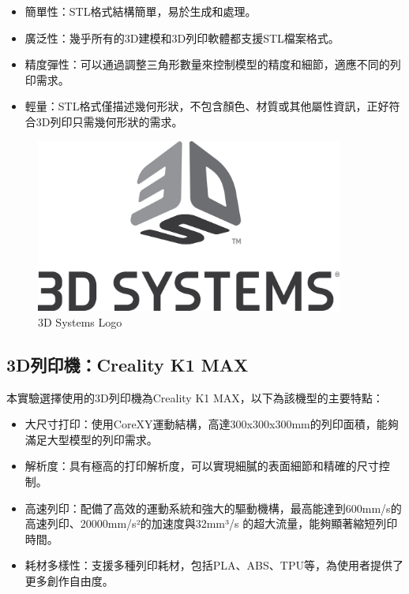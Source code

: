 \documentclass[class=NCU_thesis, crop=false]{standalone}
\begin{document}
\begin{itemize}
	\item 簡單性：STL格式結構簡單，易於生成和處理。
	\item 廣泛性：幾乎所有的3D建模和3D列印軟體都支援STL檔案格式。
	\item 精度彈性：可以通過調整三角形數量來控制模型的精度和細節，適應不同的列印需求。
	\item 輕量：STL格式僅描述幾何形狀，不包含顏色、材質或其他屬性資訊，正好符合3D列印只需幾何形狀的需求。
\end{itemize}

\begin{figure}[htbp]
    \centering
    \includegraphics[width=0.9\textwidth]{figures/3D_Systems_Logo.png}
\caption{3D Systems Logo}
\end{figure}

\subsection{3D列印機：Creality K1 MAX}
本實驗選擇使用的3D列印機為Creality K1 MAX，以下為該機型的主要特點：
\begin{itemize}
	\item 大尺寸打印：使用CoreXY運動結構，高達300x300x300mm的列印面積，能夠滿足大型模型的列印需求。
	\item 解析度：具有極高的打印解析度，可以實現細膩的表面細節和精確的尺寸控制。
	\item 高速列印：配備了高效的運動系統和強大的驅動機構，最高能達到600mm/s的高速列印、20000mm/s²的加速度與32mm³/s 的超大流量，能夠顯著縮短列印時間。
	\item 耗材多樣性：支援多種列印耗材，包括PLA、ABS、TPU等，為使用者提供了更多創作自由度。
\end{itemize}
\end{document}
